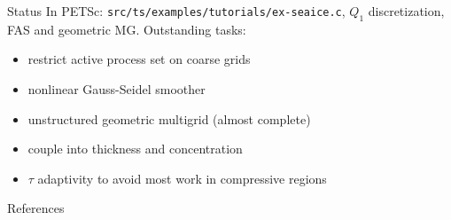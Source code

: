 \documentclass[final,t]{beamer}
\begin{document}
\begin{frame}{}
\begin{columns}
\begin{column}{0.31\textwidth}
\begin{block}{Status}
        In PETSc: \texttt{src/ts/examples/tutorials/ex-seaice.c}, $Q_1$ discretization, FAS and geometric MG.
        Outstanding tasks:
        \begin{itemize}
        \item restrict active process set on coarse grids
        \item nonlinear Gauss-Seidel smoother
        \item unstructured geometric multigrid (almost complete)
        \item couple into thickness and concentration
        \item $\tau$ adaptivity to avoid most work in compressive regions
        \end{itemize}
      \end{block}
      \vspace{-2em}
      \begin{block}{References}
        \scriptsize
        \begin{minipage}{\textwidth}
          \begin{multicols}{2}
            
          \end{multicols}
        \end{minipage}
      \end{block}
    \end{column}
  \end{columns}
\end{frame}
\end{document}
